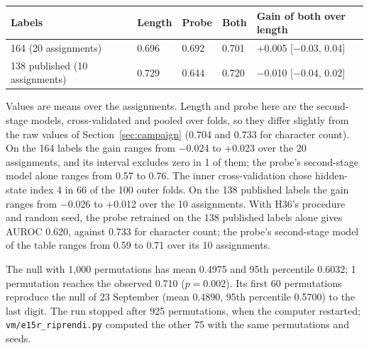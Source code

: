 \begin{center}
\small
\begin{tabular}{@{}lllll@{}}
\toprule
\textbf{Labels} & \textbf{Length} & \textbf{Probe} & \textbf{Both} & \textbf{Gain of both over length} \\
\midrule
164 (20 assignments) & 0.696 & 0.692 & 0.701 & +0.005 [$-$0.03, 0.04] \\
138 published (10 assignments) & 0.729 & 0.644 & 0.720 & $-$0.010 [$-$0.04, 0.02] \\
\bottomrule
\end{tabular}
\end{center}
Values are means over the assignments. Length and probe here are the second-stage models, cross-validated and pooled over folds, so they differ slightly from the raw values of Section~\ref{sec:campaign} (0.704 and 0.733 for character count). On the 164 labels the gain ranges from $-$0.024 to +0.023 over the 20 assignments, and its interval excludes zero in 1 of them; the probe's second-stage model alone ranges from 0.57 to 0.76. The inner cross-validation chose hidden-state index 4 in 66 of the 100 outer folds. On the 138 published labels the gain ranges from $-$0.026 to +0.012 over the 10 assignments. With H36's procedure and random seed, the probe retrained on the 138 published labels alone gives AUROC 0.620, against 0.733 for character count; the probe's second-stage model of the table ranges from 0.59 to 0.71 over its 10 assignments.

The null with 1{,}000 permutations has mean 0.4975 and 95th percentile 0.6032; 1 permutation reaches the observed 0.710 ($p = 0.002$). Its first 60 permutations reproduce the null of 23 September (mean 0.4890, 95th percentile 0.5700) to the last digit. The run stopped after 925 permutations, when the computer restarted; \texttt{vm/e15r\_riprendi.py} computed the other 75 with the same permutations and seeds.
